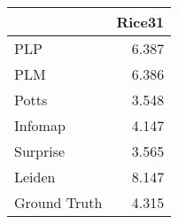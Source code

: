 \begin{tabular}{lr}
\toprule
{} & Rice31 \\
\midrule
PLP          &  6.387 \\
PLM          &  6.386 \\
Potts        &  3.548 \\
Infomap      &  4.147 \\
Surprise     &  3.565 \\
Leiden       &  8.147 \\
Ground Truth &  4.315 \\
\bottomrule
\end{tabular}
